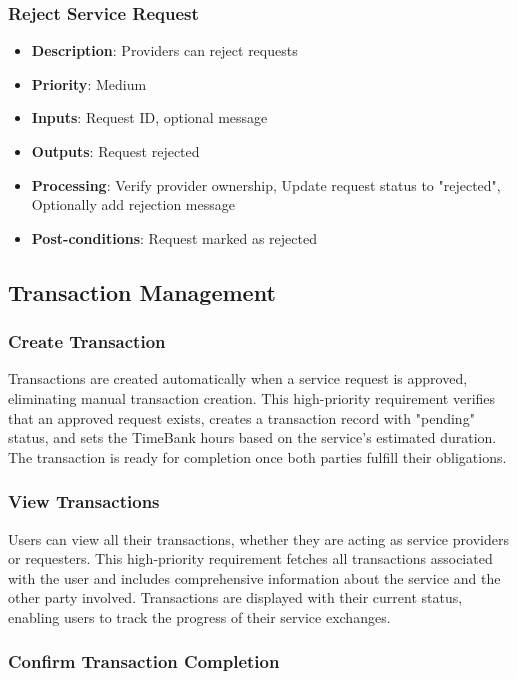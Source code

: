 \documentclass[12pt,a4paper]{report}
\begin{document}
\subsubsection{Reject Service Request}
\begin{itemize}
    \item \textbf{Description}: Providers can reject requests
    \item \textbf{Priority}: Medium
    \item \textbf{Inputs}: Request ID, optional message
    \item \textbf{Outputs}: Request rejected
    \item \textbf{Processing}: Verify provider ownership, Update request status to "rejected", Optionally add rejection message
    \item \textbf{Post-conditions}: Request marked as rejected
\end{itemize}

\subsection{Transaction Management}

\subsubsection{Create Transaction}

Transactions are created automatically when a service request is approved, eliminating manual transaction creation. This high-priority requirement verifies that an approved request exists, creates a transaction record with "pending" status, and sets the TimeBank hours based on the service's estimated duration. The transaction is ready for completion once both parties fulfill their obligations.

\subsubsection{View Transactions}

Users can view all their transactions, whether they are acting as service providers or requesters. This high-priority requirement fetches all transactions associated with the user and includes comprehensive information about the service and the other party involved. Transactions are displayed with their current status, enabling users to track the progress of their service exchanges.

\subsubsection{Confirm Transaction Completion}
\end{document}
